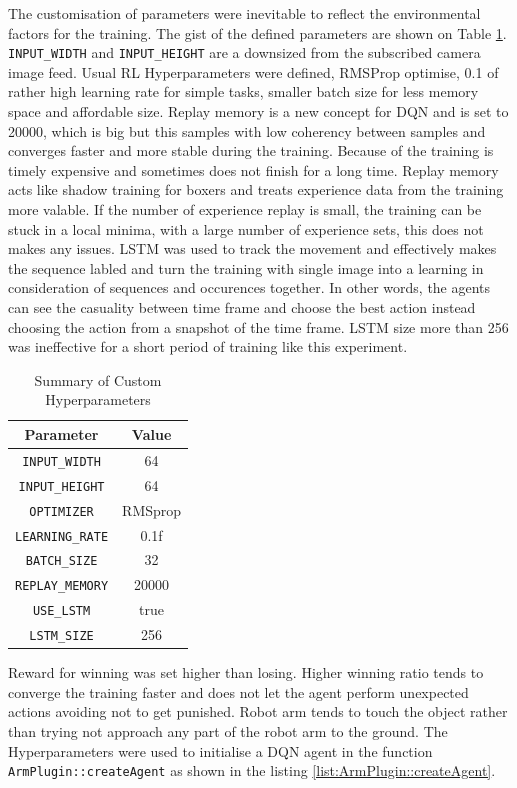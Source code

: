 \documentclass[10pt,journal,compsoc]{IEEEtran}
\begin{document}
The customisation of parameters were inevitable to reflect the environmental factors for the training. The gist of the defined parameters are shown on Table \ref{table:Custom Hyperparameters}.
\verb!INPUT_WIDTH! and \verb!INPUT_HEIGHT! are a downsized from the subscribed camera image feed. Usual RL Hyperparameters were defined, RMSProp optimise, 0.1 of rather high learning rate for simple tasks, smaller batch size for less memory space and affordable size.
Replay memory is a new concept for DQN and is set to 20000, which is big but this samples with low coherency between samples and converges faster and more stable during the training. Because of the training is timely expensive and sometimes does not finish for a long time. Replay memory acts like shadow training for boxers and treats experience data from the training more valable. If the number of experience replay is small, the training can be stuck in a local minima, with a large number of experience sets, this does not makes any issues. 
LSTM was used to track the movement and effectively makes the sequence labled and turn the training with single image into a learning in consideration of sequences and occurences together. In other words, the agents can see the casuality between time frame and choose the best action instead choosing the action from a snapshot of the time frame. LSTM size more than 256 was ineffective for a short period of training like this experiment.
\begin{table}[ht]
      \caption{Summary of Custom Hyperparameters}
      \label{table:Custom Hyperparameters}
      \begin{center}
      \begin{tabular}{|c|c|}
      \hline
      Parameter & Value \\
      \hline\hline
      \verb!INPUT_WIDTH! & 64\\
      \hline
      \verb!INPUT_HEIGHT! & 64\\
      \hline
      \verb!OPTIMIZER! & RMSprop\\
      \hline
      \verb!LEARNING_RATE! &  0.1f\\
      \hline
      \verb!BATCH_SIZE! & 32\\
      \hline
      \verb!REPLAY_MEMORY! & 20000\\
      \hline
      \verb!USE_LSTM!& true\\
      \hline
      \verb!LSTM_SIZE! &256\\
      \hline
      \end{tabular}
      \end{center}
\end{table}
Reward for winning was set higher than losing. Higher winning ratio tends to converge the training faster and does not let the agent perform unexpected actions avoiding not to get punished. Robot arm tends to touch the object rather than trying not approach any part of the robot arm to the ground.
The Hyperparameters were used to initialise a DQN agent in the function \verb!ArmPlugin::createAgent! as shown in the listing \ref{list:ArmPlugin::createAgent}.
\end{document}
